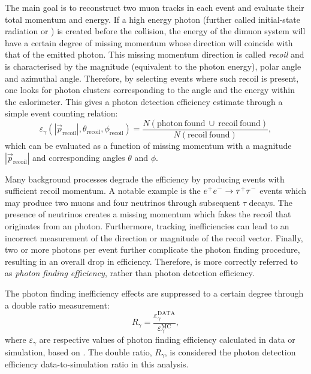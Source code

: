 The main goal is to reconstruct two muon tracks in each event and evaluate their total momentum and energy.
If a high energy photon (further called initial-state radiation or \ISR) is created before the collision, the energy of the dimuon system will have a certain degree of missing momentum whose direction will coincide with that of the emitted photon.
This missing momentum direction is called \textit{recoil} and is characterised by the magnitude (equivalent to the photon energy), polar angle and azimuthal angle.
Therefore, by selecting events where such recoil is present, one looks for photon clusters corresponding to the angle and the energy within the calorimeter.
This gives a photon detection efficiency estimate through a simple event counting relation:
\begin{equation}\label{eq:photon_efficiency}
    \varepsilon_{\gamma}(|\vec{p}_{\mathrm{recoil}}|, \theta_{\mathrm{recoil}}, \phi_{\mathrm{recoil}}) = \frac{N(\mathrm{photon~found}~\cup~\mathrm{recoil~found})}{N(\mathrm{recoil~found})},
\end{equation}
which can be evaluated as a function of missing momentum with a magnitude $|\vec{p}_{\mathrm{recoil}}|$ and corresponding angles $\theta$ and $\phi$.

Many background processes degrade the efficiency by producing events with sufficient recoil momentum.
A notable example is the $e^+e^-\rightarrow\tau^+\tau^-$ events which may produce two muons and four neutrinos through subsequent $\tau$ decays.
The presence of neutrinos creates a missing momentum which fakes the recoil that originates from an \ISR photon.
Furthermore, tracking inefficiencies can lead to an incorrect measurement of the direction or magnitude of the recoil vector.
Finally, two or more \ISR photons per event further complicate the photon finding procedure, resulting in an overall drop in efficiency.
Therefore,  is more correctly referred to as \textit{photon finding efficiency}, rather than photon detection efficiency.

The photon finding inefficiency effects are suppressed to a certain degree through a double ratio measurement:
\begin{equation}\label{eq:photon_data_mc}
    R_{\gamma} = \frac{\varepsilon_{\gamma}^{\mathrm{DATA}}}{\varepsilon_{\gamma}^{\mathrm{MC}}},
\end{equation}
where $\varepsilon_{\gamma}$ are respective values of photon finding efficiency calculated in data or simulation, based on .
The double ratio, $R_{\gamma}$, is considered the photon detection efficiency data-to-simulation ratio in this analysis.

